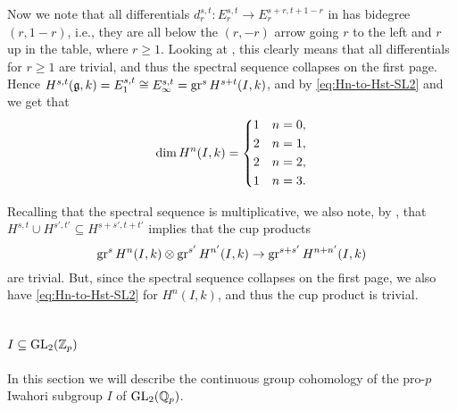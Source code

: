 Now we note that all differentials $d_{r}^{s,t} \colon E_{r}^{s,t} \to E_{r}^{s+r,t+1-r}$ in  has bidegree $(r,1-r)$, i.e., they are all below the $(r,-r)$ arrow going $r$ to the left and $r$ up in the table, where $r \geq 1$. Looking at , this clearly means that all differentials for $r \geq 1$ are trivial, and thus the spectral sequence collapses on the first page. Hence $H^{s,t}(\mathfrak{g},k) = E_{1}^{s,t} \cong E_{\infty}^{s,t} = \operatorname{gr}^{s} H^{s+t}(I,k)$, and by \eqref{eq:Hn-to-Hst-SL2} and  we get that
\begin{equation}
  \label{eq:dim-HnI-SL2}
  \dim H^{n}(I,k) =
  \begin{dcases}
    1 & n=0, \\
    2 & n=1, \\
    2 & n=2, \\
    1 & n=3.
  \end{dcases}
\end{equation}

Recalling that the spectral sequence is multiplicative, we also note, by , that $H^{s,t} \cup H^{s',t'} \subseteq H^{s+s',t+t'}$ implies that the cup products
\begin{equation*}
  \operatorname{gr}^{s} H^{n}(I,k) \otimes \operatorname{gr}^{s'} H^{n'}(I,k) \to \operatorname{gr}^{s+s'} H^{n+n'}(I,k)
\end{equation*}
are trivial. But, since the spectral sequence collapses on the first page, we also have \eqref{eq:Hn-to-Hst-SL2} for $H^{n}(I,k)$, and thus the cup product is trivial.


\section{\texorpdfstring{$I \subseteq \operatorname{GL}_{2}(\mathbb{Z}_{p})$}{I in GL2(Zp)}}%
\label{sec:Iwa-GL2}

In this section we will describe the continuous group cohomology of the pro-$p$ Iwahori subgroup $I$ of $\operatorname{GL}_{2}(\mathbb{Q}_{p})$.

